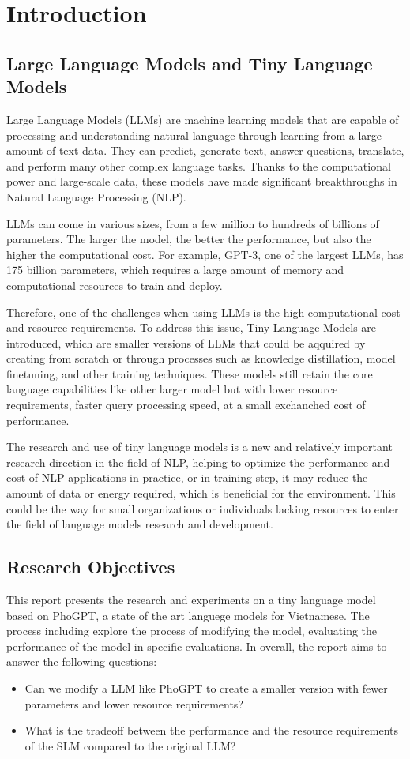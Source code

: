 \chapter{Introduction}

\section{Large Language Models and Tiny Language Models}
Large Language Models (LLMs) are machine learning models that are capable of processing and understanding natural language through learning from a large amount of text data. They can predict, generate text, answer questions, translate, and perform many other complex language tasks. Thanks to the computational power and large-scale data, these models have made significant breakthroughs in Natural Language Processing (NLP). \par 
LLMs can come in various sizes, from a few million to hundreds of billions of parameters. The larger the model, the better the performance, but also the higher the computational cost. For example, GPT-3, one of the largest LLMs, has 175 billion parameters, which requires a large amount of memory and computational resources to train and deploy. \par
Therefore, one of the challenges when using LLMs is the high computational cost and resource requirements. To address this issue, Tiny Language Models are introduced, which are smaller versions of LLMs that could be aqquired by creating from scratch or through processes such as knowledge distillation, model finetuning, and other training techniques. These models still retain the core language capabilities like other larger model but with lower resource requirements, faster query processing speed, at a small exchanched cost of performance. \par
The research and use of tiny language models is a new and relatively important research direction in the field of NLP, helping to optimize the performance and cost of NLP applications in practice, or in training step, it may reduce the amount of data or energy required, which is beneficial for the environment. This could be the way for small organizations or individuals lacking resources to enter the field of language models research and development. \par

\section{Research Objectives}
This report presents the research and experiments on a tiny language model based on PhoGPT, a state of the art languege models for Vietnamese. The process including explore the process of modifying the model, evaluating the performance of the model in specific evaluations. In overall, the report aims to answer the following questions: \par

\begin{itemize}
    \item Can we modify a LLM like PhoGPT to create a smaller version with fewer parameters and lower resource requirements?
    \item What is the tradeoff between the performance and the resource requirements of the SLM compared to the original LLM?
\end{itemize}